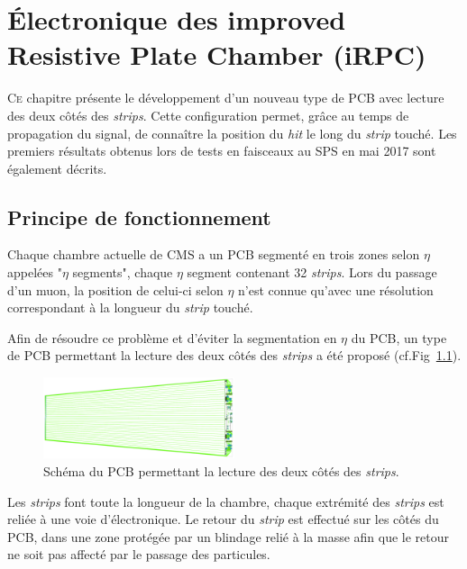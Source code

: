 \chapter{Électronique des improved Resistive Plate Chamber (iRPC)}
\label{time}
\renewcommand\chapterillustration{ELE/ele}
\ThisULCornerWallPaper{1}{\chapterillustration}
\minitoc

\lettrine[lines=4, slope=-0.5em]{C}{e} chapitre présente le développement d'un nouveau type de PCB avec lecture des deux côtés des \textit{strips}. Cette configuration permet, grâce au temps de propagation du signal, de connaître la position du \textit{hit} le long du \textit{strip} touché. Les premiers résultats obtenus lors de tests en faisceaux au SPS en mai 2017 sont également décrits.
\vspace{-0.3cm}
\section{Principe de fonctionnement}
\vspace{-0.5cm}
Chaque chambre actuelle de CMS a un PCB segmenté en trois zones selon $\eta$ appelées "$\eta$ segments", chaque $\eta$ segment contenant \num{32} \textit{strips}. Lors du passage d'un muon, la position de celui-ci selon $\eta$ n'est connue qu'avec une résolution correspondant à la longueur du \textit{strip} touché.

Afin de résoudre ce problème et d'éviter la segmentation en $\eta$ du PCB, un type de PCB permettant la lecture des deux côtés des \textit{strips} a été proposé (cf.Fig~\ref{PCB1}).
\vspace*{-0.3cm}
\begin{figure}[ht!]
	\centering
	\includegraphics[width=0.50\textwidth]{ELE/PCB1.png}
	\captionsetup{type=figure}\caption{Schéma du PCB permettant la lecture des deux côtés des \textit{strips}.}
	\label{PCB1}
\end{figure}

\vspace{-0.5cm}
Les \textit{strips} font toute la longueur de la chambre, chaque extrémité des \textit{strips} est reliée à une voie d'électronique. Le retour du \textit{strip} est effectué sur les côtés du PCB, dans une zone protégée par un blindage relié à la masse afin que le retour ne soit pas affecté par le passage des particules.


